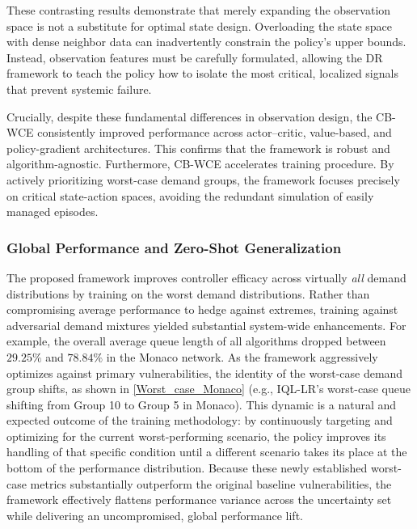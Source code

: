 \documentclass[lettersize,journal]{IEEEtran}
\begin{document}
These contrasting results demonstrate that merely expanding the observation space is not a substitute for optimal state design. Overloading the state space with dense neighbor data can inadvertently constrain the policy's upper bounds. Instead, observation features must be carefully formulated, allowing the DR framework to teach the policy how to isolate the most critical, localized signals that prevent systemic failure.

Crucially, despite these fundamental differences in observation design, the CB-WCE consistently improved performance across actor--critic, value-based, and policy-gradient architectures. This confirms that the framework is robust and algorithm-agnostic. Furthermore, CB-WCE accelerates training procedure. By actively prioritizing worst-case demand groups, the framework focuses precisely on critical state-action spaces, avoiding the redundant simulation of easily managed episodes.

\subsubsection{Global Performance and Zero-Shot Generalization}
The proposed framework improves controller efficacy across virtually \textit{all} demand distributions by training on the worst demand distributions. Rather than compromising average performance to hedge against extremes, training against adversarial demand mixtures yielded substantial system-wide enhancements. For example, the overall average queue length of all algorithms dropped between $29.25\%$ and $78.84\%$ in the Monaco network.
As the framework aggressively optimizes against primary vulnerabilities, the identity of the worst-case demand group shifts, as shown in \cref{Worst_case_Monaco} (e.g., IQL-LR's worst-case queue shifting from Group 10 to Group 5 in Monaco). This dynamic is a natural and expected outcome of the training methodology: by continuously targeting and optimizing for the current worst-performing scenario, the policy improves its handling of that specific condition until a different scenario takes its place at the bottom of the performance distribution. Because these newly established worst-case metrics substantially outperform the original baseline vulnerabilities, the framework effectively flattens performance variance across the uncertainty set while delivering an uncompromised, global performance lift.
\end{document}
